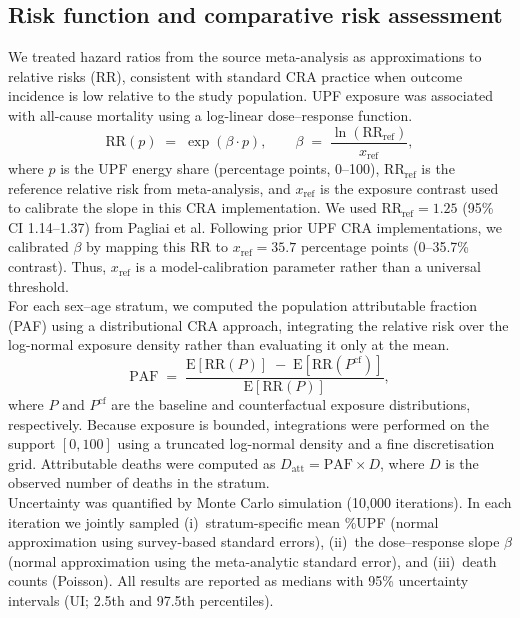 \documentclass{article}
\begin{document}
\subsection{Risk function and comparative risk assessment}

We treated hazard ratios from the source meta-analysis as approximations to relative risks (RR), consistent with standard CRA practice when outcome incidence is low relative to the study population.\cite{Murray2003} UPF exposure was associated with all-cause mortality using a log-linear dose--response function.
%
\begin{equation}
\text{RR}(p) \;=\; \exp(\beta \cdot p), \qquad \beta \;=\; \frac{\ln(\text{RR}_{\text{ref}})}{x_{\text{ref}}},
\end{equation}
%
where $p$ is the UPF energy share (percentage points, 0--100), $\text{RR}_{\text{ref}}$ is the reference relative risk from meta-analysis, and $x_{\text{ref}}$ is the exposure contrast used to calibrate the slope in this CRA implementation. We used $\text{RR}_{\text{ref}} = 1.25$ (95\% CI 1.14--1.37) from Pagliai et al.\cite{Pagliai2021} Following prior UPF CRA implementations,\cite{Nilson2023} we calibrated $\beta$ by mapping this RR to $x_{\text{ref}} = 35.7$ percentage points (0--35.7\% contrast). Thus, $x_{\text{ref}}$ is a model-calibration parameter rather than a universal threshold. \\

For each sex--age stratum, we computed the population attributable fraction (PAF) using a distributional CRA approach, integrating the relative risk over the log-normal exposure density rather than evaluating it only at the mean.
%
\begin{equation}
\text{PAF} \;=\; \frac{\text{E}[\text{RR}(P)] \;-
\; \text{E}[\text{RR}(P^{\text{cf}})]}{\text{E}[\text{RR}(P)]},
\end{equation}
%
where $P$ and $P^{\text{cf}}$ are the baseline and counterfactual exposure distributions, respectively. Because exposure is bounded, integrations were performed on the support $[0,100]$ using a truncated log-normal density and a fine discretisation grid. Attributable deaths were computed as $D_{\text{att}} = \text{PAF} \times D$, where $D$ is the observed number of deaths in the stratum. \\

Uncertainty was quantified by Monte Carlo simulation (10,000 iterations). In each iteration we jointly sampled (i)~stratum-specific mean \%UPF (normal approximation using survey-based standard errors), (ii)~the dose--response slope $\beta$ (normal approximation using the meta-analytic standard error), and (iii)~death counts (Poisson). All results are reported as medians with 95\% uncertainty intervals (UI; 2.5th and 97.5th percentiles).
\end{document}
